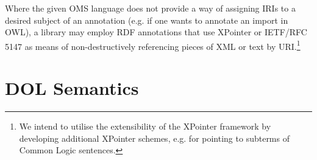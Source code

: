 \documentclass[10pt,fleqn,%
\ifpretendfinal
final%
\else
draft%
\fi,
]{scrreprt}
\makeatletter
\newcommand*{\eg}{e.g.\@\xspace}
\newcommand*{\CL}{\ensuremath{\mathsf{CL}}\xspace}
\newcommand{\clause}[1]{\chapter{#1}}
\newcommand{\nisref}[1]{#1}
\makeatother
\begin{document}
Where the given OMS language does not provide a way of assigning IRIs to a desired subject of an annotation (\eg if one wants to annotate an import in OWL), a library may employ RDF annotations that use XPointer or \nisref{IETF/RFC 5147} as means of non-destructively referencing pieces of XML or text by URI.\footnote{We intend to utilise the extensibility of the XPointer framework by developing additional XPointer schemes, \eg for pointing to subterms of Common Logic sentences.}

\clause{DOL Semantics}\label{c:semantics}

%
%

\end{document}
